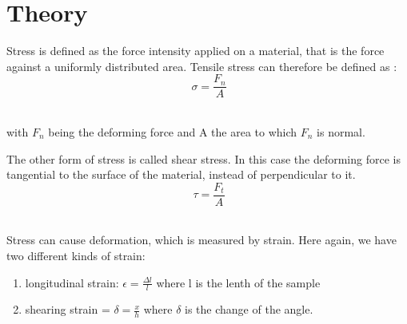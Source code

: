 \documentclass{scrartcl}
\begin{document}
\section{Theory}
Stress is defined as the force intensity applied on a material, that is the force against a uniformly distributed area. Tensile stress can therefore be defined as \cite{Handout}:
\[\ \sigma= \frac{F_n}{A} \]\ 

with $F_n$ being the deforming force and A the area to which $F_n$ is normal.

 The other form of stress is called shear stress. In this case the deforming force is tangential to the surface of the material, instead of perpendicular to it.
\[\ \tau= \frac{F_t}{A} \]\

Stress can cause deformation, which is measured by strain. Here again, we have two different kinds of strain:
\begin{enumerate}
    \item longitudinal strain: $\epsilon = \frac{\Delta l}{l}$ where l is the lenth of the sample
    \item shearing strain = $\delta = \frac{x}{h}$ where $\delta$ is the change of the angle.
\end{enumerate}
\end{document}
